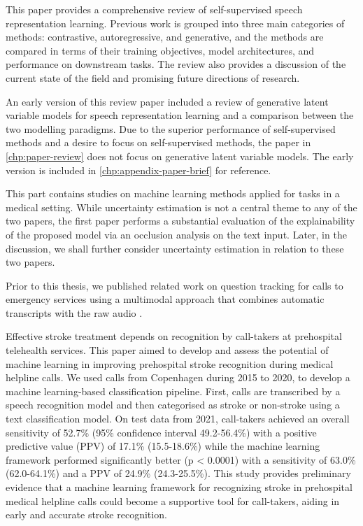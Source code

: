 This paper provides a comprehensive review of self-supervised speech representation learning. Previous work is grouped into three main categories of methods: contrastive, autoregressive, and generative, and the methods are compared in terms of their training objectives, model architectures, and performance on downstream tasks. The review also provides a discussion of the current state of the field and promising future directions of research. 

An early version of this review paper \cite{borgholt_brief_2022} included a review of generative latent variable models for speech representation learning and a comparison between the two modelling paradigms. Due to the superior performance of self-supervised methods and a desire to focus on self-supervised methods, the paper in \cref{chp:paper-review} does not focus on generative latent variable models. The early version is included in \cref{chp:appendix-paper-brief} for reference.


 
This part contains studies on machine learning methods applied for tasks in a medical setting. While uncertainty estimation is not a central theme to any of the two papers, the first paper performs a substantial evaluation of the explainability of the proposed model via an occlusion analysis on the text input. Later, in the discussion, we shall further consider uncertainty estimation in relation to these two papers.

Prior to this thesis, we published related work on question tracking for calls to emergency services using a multimodal approach that combines automatic transcripts with the raw audio \cite{havtorn_multiqt_2020}. 


Effective stroke treatment depends on recognition by call-takers at prehospital telehealth services. This paper aimed to develop and assess the potential of machine learning in improving prehospital stroke recognition during medical helpline calls. 
We used calls from Copenhagen during 2015 to 2020, to develop a machine learning-based classification pipeline. First, calls are transcribed by a speech recognition model and then categorised as stroke or non-stroke using a text classification model.
On test data from 2021, call-takers achieved an overall sensitivity of 52.7\% (95\% confidence interval 49.2-56.4\%) with a positive predictive value (PPV) of 17.1\% (15.5-18.6\%) while the machine learning framework performed significantly better (p < 0.0001) with a sensitivity of 63.0\% (62.0-64.1\%) and a PPV of 24.9\% (24.3-25.5\%).
This study provides preliminary evidence that a machine learning framework for recognizing stroke in prehospital medical helpline calls could become a supportive tool for call-takers, aiding in early and accurate stroke recognition.



